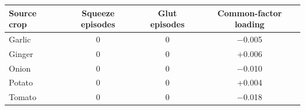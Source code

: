 \renewcommand{\arraystretch}{1.25}
\footnotesize
\begin{tabular}{|l|c|c|c|}
\hline
\textbf{Source crop} & \textbf{Squeeze episodes} & \textbf{Glut episodes} & \textbf{Common-factor loading} \\
\hline
Garlic & 0 & 0 & $-$0.005 \\
\hline
Ginger & 0 & 0 & +0.006 \\
\hline
Onion & 0 & 0 & $-$0.010 \\
\hline
Potato & 0 & 0 & +0.004 \\
\hline
Tomato & 0 & 0 & $-$0.018 \\
\hline
\end{tabular}
